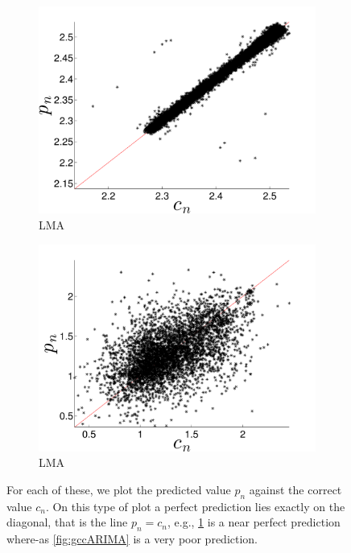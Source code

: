 \begin{figure}[htbp]
\begin{subfigure}{0.49\textwidth}
    \includegraphics[width=\textwidth]{figs/colLMAForecast}
    \caption{\col LMA}
    \label{fig:colLMA}
  \end{subfigure}
      \begin{subfigure}{0.49\textwidth}
    \includegraphics[width=\textwidth]{figs/gccLMAForecast}
    \caption{\gcc LMA}
    \label{fig:gccLMA}
  \end{subfigure}  


  
   \caption{
For each of these, we plot the predicted value $p_n$ against the correct value $c_n$. On this type of plot a perfect prediction lies exactly on the diagonal, that is the line $p_n = c_n$, e.g., \ref{fig:colLMA} is a near perfect prediction where-as \ref{fig:gccARIMA} is a very poor prediction. }\label{fig:gcc_vs_col}  
\end{figure} 
